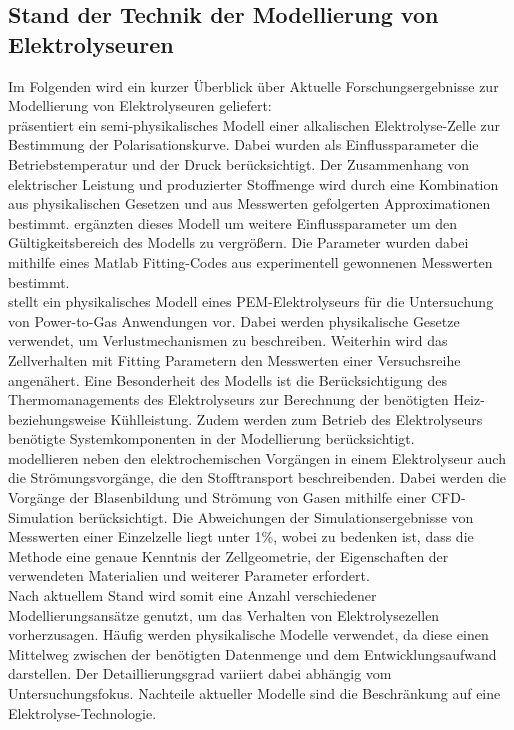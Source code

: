 \subsection{Stand der Technik der Modellierung von Elektrolyseuren}
Im Folgenden wird ein kurzer Überblick über Aktuelle Forschungsergebnisse zur Modellierung von Elektrolyseuren geliefert:\\

\citet{ulleberg_modeling_2003} präsentiert ein semi-physikalisches Modell einer alkalischen Elektrolyse-Zelle zur Bestimmung der Polarisationskurve. Dabei wurden als Einflussparameter die Betriebstemperatur und der Druck berücksichtigt. Der Zusammenhang von elektrischer Leistung und produzierter Stoffmenge wird durch eine Kombination aus physikalischen Gesetzen und aus Messwerten gefolgerten Approximationen bestimmt. \citet{amores_influence_2014} ergänzten dieses Modell um weitere Einflussparameter um den Gültigkeitsbereich des Modells zu vergrößern. Die Parameter wurden dabei mithilfe eines Matlab Fitting-Codes aus experimentell gewonnenen Messwerten bestimmt.\\

\citet{tjarks_pem-elektrolyse-systeme_2017} stellt ein physikalisches Modell eines PEM-Elektrolyseurs für die Untersuchung von Power-to-Gas Anwendungen vor. Dabei werden physikalische Gesetze verwendet, um Verlustmechanismen zu beschreiben. Weiterhin wird das Zellverhalten mit Fitting Parametern den Messwerten einer Versuchsreihe angenähert. Eine Besonderheit des Modells ist die Berücksichtigung des Thermomanagements des Elektrolyseurs zur Berechnung der benötigten Heiz- beziehungsweise Kühlleistung. Zudem werden zum Betrieb des Elektrolyseurs benötigte Systemkomponenten in der Modellierung berücksichtigt.\\

\citet{rodriguez_cfd_2020} modellieren neben den elektrochemischen Vorgängen in einem Elektrolyseur auch die Strömungsvorgänge, die den Stofftransport beschreibenden. Dabei werden die Vorgänge der Blasenbildung und Strömung von Gasen mithilfe einer CFD-Simulation berücksichtigt. Die Abweichungen der Simulationsergebnisse von Messwerten einer Einzelzelle liegt unter 1\%, wobei zu bedenken ist, dass die Methode eine genaue Kenntnis der Zellgeometrie, der Eigenschaften der verwendeten Materialien und weiterer Parameter erfordert.\\

Nach aktuellem Stand wird somit eine Anzahl verschiedener Modellierungsansätze genutzt, um das Verhalten von Elektrolysezellen vorherzusagen. Häufig werden physikalische Modelle verwendet, da diese einen Mittelweg zwischen der benötigten Datenmenge und dem Entwicklungsaufwand darstellen. Der Detaillierungsgrad variiert dabei abhängig vom Untersuchungsfokus. Nachteile aktueller Modelle sind die Beschränkung auf eine Elektrolyse-Technologie.

